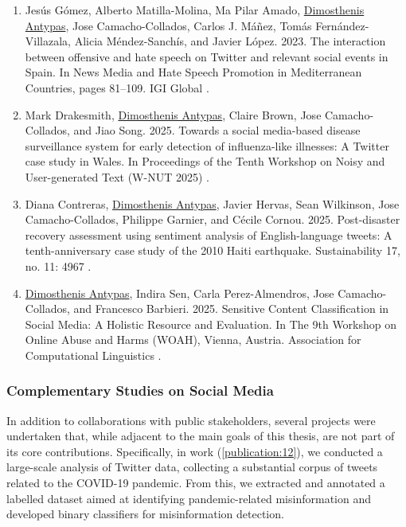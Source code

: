 \begin{enumerate}[start=8]
    \item \label{publication:8} Jesús Gómez, Alberto Matilla-Molina, Ma Pilar Amado, \underline{Dimosthenis Antypas}, Jose Camacho-Collados, Carlos J. Máñez, Tomás Fernández-Villazala, Alicia Méndez-Sanchís, and Javier López. 2023. The interaction between offensive and hate speech on Twitter and relevant social events in Spain. In News Media and Hate Speech Promotion in Mediterranean Countries, pages 81–109. IGI Global \cite{gomez2023interaction}.

    \item \label{publication:9} Mark Drakesmith, \underline{Dimosthenis Antypas}, Claire Brown, Jose Camacho-Collados, and Jiao Song. 2025. Towards a social media-based disease surveillance system for early detection of influenza-like illnesses: A Twitter case study in Wales. In Proceedings of the Tenth Workshop on Noisy and User-generated Text (W-NUT 2025) \cite{drakesmith2024towards}.
    
    \item \label{publication:10} Diana Contreras, \underline{Dimosthenis Antypas}, Javier Hervas, Sean Wilkinson, Jose Camacho-Collados, Philippe Garnier, and Cécile Cornou. 2025. Post-disaster recovery assessment using sentiment analysis of English-language tweets: A tenth-anniversary case study of the 2010 Haiti earthquake. Sustainability 17, no. 11: 4967 \cite{su17114967}.
    
    \item \label{publication:11} \underline{Dimosthenis Antypas}, Indira Sen, Carla Perez-Almendros, Jose Camacho-Collados, and Francesco Barbieri. 2025. Sensitive Content Classification in Social Media: A Holistic Resource and Evaluation. In The 9th Workshop on Online Abuse and Harms (WOAH), Vienna, Austria. Association for Computational Linguistics \cite{antypas-etal-2025-sensitive}.
\end{enumerate}


\subsubsection{Complementary Studies on Social Media}

In addition to collaborations with public stakeholders, several projects were undertaken that, while adjacent to the main goals of this thesis, are not part of its core contributions. Specifically, in work (\ref{publication:12}), we conducted a large-scale analysis of Twitter data, collecting a substantial corpus of tweets related to the COVID-19 pandemic. From this, we extracted and annotated a labelled dataset aimed at identifying pandemic-related misinformation and developed binary classifiers for misinformation detection.

